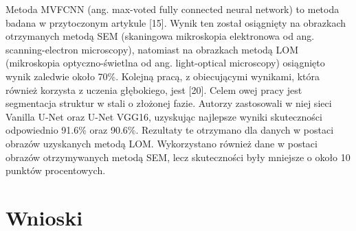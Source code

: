 Metoda MVFCNN (ang. max-voted fully connected neural network) to metoda badana w przytoczonym artykule [15]. Wynik ten został osiągnięty na obrazkach otrzymanych metodą SEM (skaningowa mikroskopia elektronowa od ang. scanning-electron microscopy), natomiast na obrazkach metodą LOM (mikroskopia optyczno-świetlna od ang. light-optical microscopy) osiągnięto wynik zaledwie około 70\%.
    Kolejną pracą, z obiecującymi wynikami, która również korzysta z uczenia głębokiego, jest [20]. Celem owej pracy jest segmentacja struktur w stali o złożonej fazie. Autorzy zastosowali w niej sieci Vanilla U-Net oraz U-Net VGG16, uzyskując najlepsze wyniki skuteczności odpowiednio 91.6\% oraz 90.6\%. Rezultaty te otrzymano dla danych w postaci obrazów uzyskanych metodą LOM. Wykorzystano również dane w postaci obrazów otrzymywanych metodą SEM, lecz skuteczności były mniejsze o około 10 punktów procentowych.

\section{Wnioski}
\label{cha2.3}

